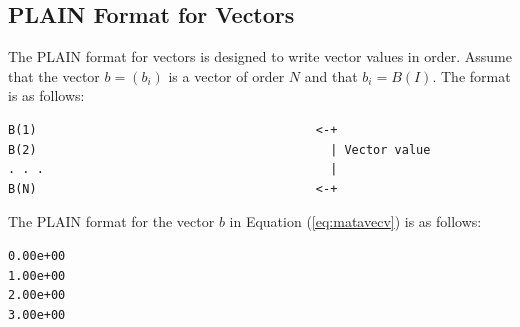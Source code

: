 \documentclass[a4paper]{article}
\begin{document}
\subsection{PLAIN Format for Vectors}
The PLAIN format for vectors is designed to write vector values in order. Assume that the vector $b=(b_{i})$ is a vector of order $N$ and that $b_{i} = B(I)$. The format is as follows:

{\small
\begin{verbatim}
B(1)                                       <-+
B(2)                                         | Vector value
. . .                                        | 
B(N)                                       <-+ 
\end{verbatim}
}

The PLAIN format for the vector $b$ in Equation (\ref{eq:matavecv}) is as follows: 

{\small
\begin{verbatim}
0.00e+00
1.00e+00
2.00e+00
3.00e+00
\end{verbatim}
}
\end{document}
